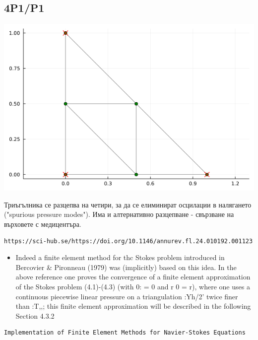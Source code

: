 \documentclass[fleqn,12pt]{article}
\begin{document}
\subsection{4P1/P1}
\includegraphics[width=140mm]{img/4p1p1.png}

Триъгълника се разцепва на четири, за да се елиминират осцилации в налягането ("spurious pressure modes").
Има и алтернативно разцепване - свързване на върховете с медицентъра.

\begin{verbatim}
https://sci-hub.se/https://doi.org/10.1146/annurev.fl.24.010192.001123
\end{verbatim}
\begin{itemize}
    \item Indeed a finite element method for thc Stokes problem
    introduced in Bercovier \& Pironneau (1979) was (implicitly) based on this
    idea. In the above reference one proves the convergence of a finite element
    approximation of the Stokes problem (4.1)-(4.3) (with 0: = 0 and r 0 = r),
    where one uses a continuous piecewise linear pressure on a triangulation
    :Yh/2' twice finer than :T,,; this finite element approximation will be described
    in the following Section 4.3.2
\end{itemize}

\begin{verbatim}
Implementation of Finite Element Methods for Navier-Stokes Equations
\end{verbatim}
\end{document}
